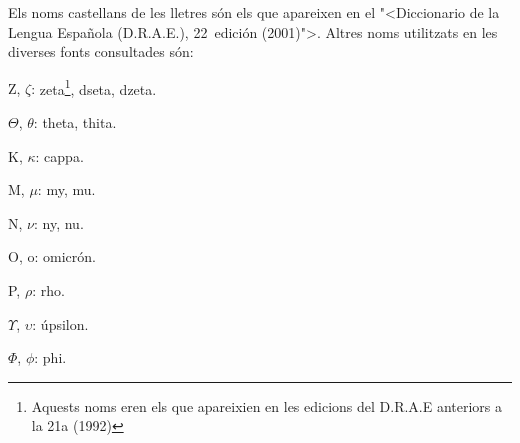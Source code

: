 Els noms castellans de les lletres s\'{o}n els que apareixen en el
{"<}Diccionario de la Lengua Espa\~{n}ola (D.R.A.E.), 22\textordfeminine\
edici\'{o}n (2001){">}. Altres noms utilitzats en les diverses fonts
consultades s\'{o}n:
\begin{multicols}{3}
\begin{list}{}
   {\setlength{\labelwidth}{16mm} \setlength{\leftmargin}{16mm} \setlength{\labelsep}{2mm}}
   \item[Z, $\zeta$:] zeta\footnote{Aquests noms eren els que apareixien en les edicions
   del D.R.A.E anteriors a la 21a (1992)}, dseta, dzeta.
   \item[$\Theta$, $\theta$:] theta\footnotemark[1], thita.
   \item[K, $\kappa$:] cappa.
   \item[M, $\mu$:] my\footnotemark[1], mu.
   \item[N, $\nu$:] ny\footnotemark[1], nu.
   \item[O, o:] omicr\'{o}n.
   \item[P, $\rho$:] rho.
   \item[$\Upsilon$, $\upsilon$:] \'{u}psilon.
   \item[$\Phi$, $\phi$:] phi.
\end{list}
\end{multicols}

